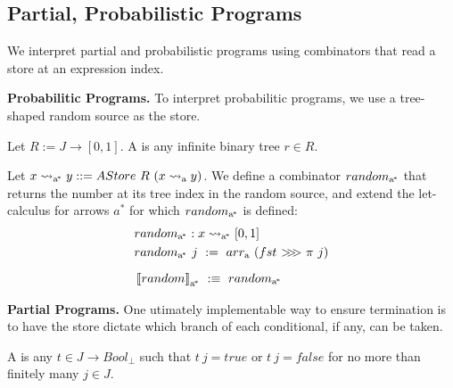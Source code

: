 \documentclass{llncs}
\renewcommand{\paragraph}[1]{\vspace{0.5\baselineskip}\noindent\textbf{{#1}.}\hspace{0.25\baselineskip}}
\newcommand{\arrow}{\rightsquigarrow}
\newcommand{\arrowarr}{\ensuremath{arr}}
\newcommand{\arrowcomp}{\ensuremath{{>}\mspace{-6mu}{>}\mspace{-6mu}{>}}}
\newcommand{\gen}{_\mathrm{a}}
\newcommand{\genc}{_\mathrm{a^{\mspace{-2mu}*}}}
\begin{document}
\subsection{Partial, Probabilistic Programs}
\label{sec:probabilistic-programs}

We interpret partial and probabilistic programs using combinators that read a store at an expression index.

\paragraph{Probabilitic Programs}
To interpret probabilitic programs, we use a tree-shaped random source as the store.

\begin{definition}
Let $R := J \to [0,1]$.
A  is any infinite binary tree $r \in R$.
\end{definition}

Let $x \arrow\genc y ::= AStore~R~(x \arrow\gen y)$.
We define a combinator $random\genc$ that returns the number at its tree index in the random source, and extend the let-calculus for arrows $a^*$ for which $random\genc$ is defined:
\begin{equation}
\begin{aligned}
	&random\genc : x \arrow\genc [0,1] \\
	&random\genc~j \ := \ \arrowarr\gen~(fst~\arrowcomp~\pi~j)
\\[6pt]
	&\meaningof{random}\genc \ :\equiv \ random\genc
\end{aligned}
\end{equation}

\paragraph{Partial Programs}
One utimately implementable way to ensure termination is to have the store dictate which branch of each conditional, if any, can be taken.

\begin{definition}
A  is any $t \in J \to Bool_\bot$ such that $t~j = true$ or $t~j = false$ for no more than finitely many $j \in J$.
\end{definition}
\end{document}
